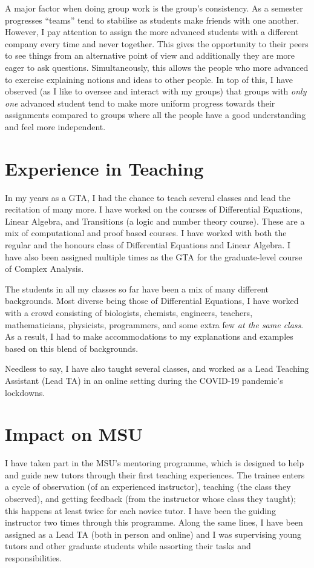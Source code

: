 \documentclass[11pt]{amsart}	%
\begin{document}
A major factor when doing group work is the group's consistency. As a semester progresses ``teams'' tend to stabilise as students make friends with one another. However, I pay attention to assign the more advanced students with a different company every time and never together. This gives the opportunity to their peers to see things from an alternative point of view and additionally they are more eager to ask questions. Simultaneously, this allows the people who more advanced to exercise explaining notions and ideas to other people. In top of this, I have observed (as I like to oversee and interact with my groups) that groups with \emph{only one} advanced student tend to make more uniform progress towards their assignments compared to groups where all the people have a good understanding and feel more independent.

\section*{Experience in Teaching}

In my years as a GTA, I had the chance to teach several classes and lead the recitation of many more. I have worked on the courses of Differential Equations, Linear Algebra, and Transitions (a logic and number theory course). These are a mix of computational and proof based courses. I have worked with both the regular and the honours class of Differential Equations and Linear Algebra. I have also been assigned multiple times as the GTA for the graduate-level course of Complex Analysis.

The students in all my classes so far have been a mix of many different backgrounds. Most diverse being those of Differential Equations, I have worked with a crowd consisting of biologists, chemists, engineers, teachers, mathematicians, physicists, programmers, and some extra few \emph{at the same class}. As a result, I had to make accommodations to my explanations and examples based on this blend of backgrounds.

Needless to say, I have also taught several classes, and worked as a Lead Teaching Assistant (Lead TA) in an online setting during the COVID-19 pandemic's lockdowns.

\section*{Impact on MSU}

I have taken part in the MSU's mentoring programme, which is designed to help and guide new tutors through their first teaching experiences. The trainee enters a cycle of observation (of an experienced instructor), teaching (the class they observed), and getting feedback (from the instructor whose class they taught); this happens at least twice for each novice tutor. I have been the guiding instructor two times through this programme. Along the same lines, I have been assigned as a Lead TA (both in person and online) and I was supervising young tutors and other graduate students while assorting their tasks and responsibilities.
\end{document}
